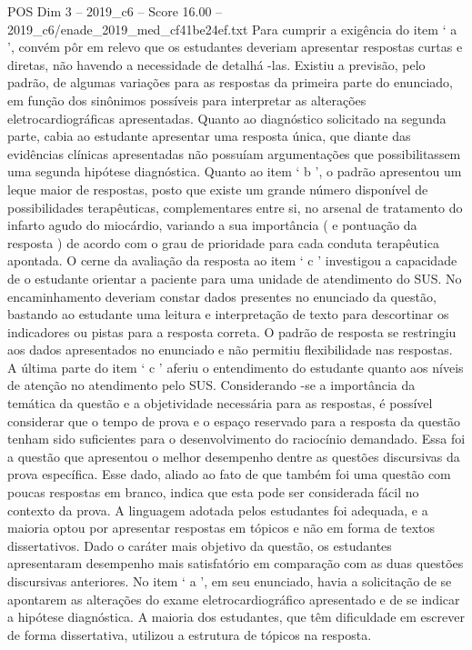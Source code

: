 \begin{textsample}{POS Dim 3 – 2019\_c6 – Score 16.00 – 2019\_c6/enade\_2019\_med\_cf41be24ef.txt}
Para cumprir a exigência do item ‘ a ’, convém pôr em relevo que os estudantes deveriam apresentar respostas curtas e diretas, não havendo a necessidade de detalhá -las.
Existiu a previsão, pelo padrão, de algumas variações para as respostas da primeira parte do enunciado, em função dos sinônimos possíveis para interpretar as alterações eletrocardiográficas apresentadas.
Quanto ao diagnóstico solicitado na segunda parte, cabia ao estudante apresentar uma resposta única, que diante das evidências clínicas apresentadas não possuíam argumentações que possibilitassem uma segunda hipótese diagnóstica.
Quanto ao item ‘ b ’, o padrão apresentou um leque maior de respostas, posto que existe um grande número disponível de possibilidades terapêuticas, complementares entre si, no arsenal de tratamento do infarto agudo do miocárdio, variando a sua importância ( e pontuação da resposta ) de acordo com o grau de prioridade para cada conduta terapêutica apontada.
O cerne da avaliação da resposta ao item ‘ c ’ investigou a capacidade de o estudante orientar a paciente para uma unidade de atendimento do SUS.
No encaminhamento deveriam constar dados presentes no enunciado da questão, bastando ao estudante uma leitura e interpretação de texto para descortinar os indicadores ou pistas para a resposta correta.
O padrão de resposta se restringiu aos dados apresentados no enunciado e não permitiu flexibilidade nas respostas.
A última parte do item ‘ c ’ aferiu o entendimento do estudante quanto aos níveis de atenção no atendimento pelo SUS.
Considerando -se a importância da temática da questão e a objetividade necessária para as respostas, é possível considerar que o tempo de prova e o espaço reservado para a resposta da questão tenham sido suficientes para o desenvolvimento do raciocínio demandado.
Essa foi a questão que apresentou o melhor desempenho dentre as questões discursivas da prova específica.
Esse dado, aliado ao fato de que também foi uma questão com poucas respostas em branco, indica que esta pode ser considerada fácil no contexto da prova.
A linguagem adotada pelos estudantes foi adequada, e a maioria optou por apresentar respostas em tópicos e não em forma de textos dissertativos.
Dado o caráter mais objetivo da questão, os estudantes apresentaram desempenho mais satisfatório em comparação com as duas questões discursivas anteriores.
No item ‘ a ’, em seu enunciado, havia a solicitação de se apontarem as alterações do exame eletrocardiográfico apresentado e de se indicar a hipótese diagnóstica.
A maioria dos estudantes, que têm dificuldade em escrever de forma dissertativa, utilizou a estrutura de tópicos na resposta.

\end{textsample}
